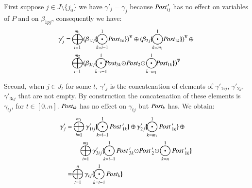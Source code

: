 \documentclass{elsarticle}
\newcommand{\TODO}[1]{\textcolor{red}{\textbf{[TODO:#1]}}}
\newcommand{\shortodot}{\!\odot\!}
\begin{document}
 First suppose $j\in J\setminus\{j_0\}$ we have $\gamma'_j=\gamma_j$ because $\Post^{\,\prime}_{ij}$ has no effect on variables of $P$ and on $\beta_{1pj}$, consequently we have:\\
{\small \begin{equation*}
\begin{split}\gamma'_j=&\bigoplus_{i=1}^{m_1} \vis{{\beta_{1ij}}\subst{\bigodot_{k=i-1}^{1}\! \Post_{1k} } }  \oplus  \vis{{\beta_{2j}}\subst{\bigodot_{k=m_1}^{1}\!\Post_{1k}}}\, \oplus\\&
\bigoplus_{i=1}^{m_2} \vis{\beta_{3ij} \subst{\!\bigodot_{k=i-1}^{1}\!\!\!\Post_{3k}\shortodot\Post_2\shortodot\bigodot_{k=m_1}^{1}\!\!\Post_{1k}}}
\end{split}
\end{equation*}
}

Second, when $j\in J_t$ for some $t$,  $\gamma'_j$ is the concatenation of elements of $\gamma'_{1ij}$, $\gamma'_{2 j}$, $\gamma'_{3ij}$  that are not empty. By construction the concatenation of these elements is $\gamma_{tj}$, for $t\in[0..n]$. $\Post_{ik}$ has no effect on $\gamma_{tj}$ but  $\Post_{k}$ has.
We obtain:
{\small\begin{equation*}
\begin{split}
\gamma'_j =&
\bigoplus_{i=1}^{m_1}{\gamma'_{1ij}}\subst{\bigodot_{k=i-1}^{1}\Post\,'_{1k}}\oplus
 {\gamma'_{2 j}}\subst{\bigodot_{k=m_1}^{1}\Post\,'_{1k}}\,\oplus\\&\quad \bigoplus_{i=1}^{m_2}{\gamma'_{3ij}}\subst{\bigodot_{k=i-1}^{1}\Post\,'_{3k}\shortodot\Post\,'_2\shortodot\bigodot_{k=n}^{1}\Post\,'_{1k}}\\
=&
{\bigoplus_{t=1}^{n} {\gamma_{tj}}\subst{\bigodot_{k=t-1}^{1} \Post_{k}}}   
\end{split}
\end{equation*}
}
\end{document}
